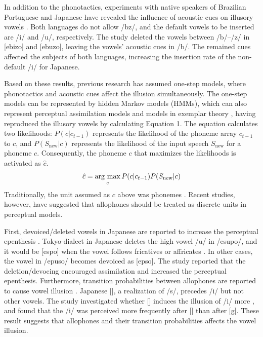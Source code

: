 \documentclass[a4paper,11pt,twocolumn]{article}
\newcommand{\argmax}{\mathop{\rm arg~max}\limits}
\begin{document}
In addition to the phonotactics, experiments with native speakers of Brazilian Portuguese and Japanese have revealed the influence of acoustic cues on illusory vowels \cite{dupoux2011illusory}. Both languages do not allow /bz/, and the default vowels to be inserted are /i/ and /u/, respectively. The study deleted the vowels between /b/--/z/ in [ebizo] and [ebuzo], leaving the vowels' acoustic cues in /b/. The remained cues affected the subjects of both languages, increasing the insertion rate of the non-default /i/ for Japanese.

Based on these results, previous research has assumed one-step models, where phonotactics and acoustic cues affect the illusion simultaneously. The one-step models can be represented by hidden Markov models (HMMs), which can also represent perceptual assimilation models \cite{best2001discrimination} and models in exemplar theory \cite{lacerda1995perceptual}, having reproduced the illusory vowels \cite{kishiyama2021influence} by calculating Equation 1. The equation calculates two likelihoods: $P(c|c_{t-1})$ represents the likelihood of the phoneme array $c_{t-1}$ to $c$, and $P(S_{\text{new}}|c)$ represents the likelihood of the input speech $S_{\text{new}}$ for a phoneme $c$. Consequently, the phoneme $c$ that maximizes the likelihoods is activated as $\hat{c}$.
\begin{equation} \label{hmm}
    \hat{c} = \argmax_{c} P(c | c_{t-1})P(S_{\text{new}}|c)
\end{equation}
Traditionally, the unit assumed as $c$ above was phonemes \cite{wilson2013bayesian}. Recent studies, however, have suggested that allophones should be treated as discrete units in perceptual models.

First, devoiced/deleted vowels in Japanese are reported to increase the perceptual epenthesis \cite{kilpatrick2018japanese}. Tokyo-dialect in Japanese deletes the high vowel /u/ in /esupo/, and it would be [espo] when the vowel follows fricatives or affricates \cite{fujimoto2003devoice_eng, shaw2018lingual}. In other cases, the vowel in /epuso/ becomes devoiced as [ep\textsubring{\textturnm}so]. The study reported that the deletion/devocing encouraged assimilation and increased the perceptual epenthesis. Furthermore, transition probabilities between allophones are reported to cause vowel illusion \cite{kilpatrick2020japanese}. Japanese [\textctc], a realization of /s/, precedes /i/ but not other vowels. The study investigated whether [\textctc{}] induces the illusion of /i/ more \cite{kilpatrick2020japanese}, and found that the /i/ was perceived more frequently after [\textctc] than after [g]. These result suggests that allophones and their transition probabilities affects the vowel illusion.
\end{document}

